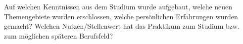 \documentclass[crop=false]{standalone}
\begin{document}
Auf welchen Kenntnissen aus dem Studium wurde aufgebaut, welche neuen Themengebiete wurden erschlossen, welche persönlichen Erfahrungen wurden gemacht? 
Welchen Nutzen/Stellenwert hat das Praktikum zum Studium bzw. zum möglichen späteren Berufsfeld? 
\end{document}
